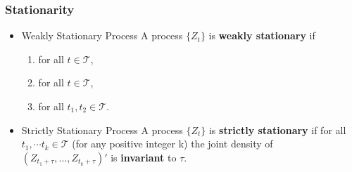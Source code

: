 \documentclass{beamer}
\begin{document}
		
		\begin{frame}
			
			\frametitle{Stationarity}
			\large
			\begin{itemize}
				\item[]\begin{mydef*}[width=5.5in]{Weakly Stationary Process}  A process $\{Z_t\}$   is \textbf{weakly stationary} if
					\vspace{4pt}
					\begin{enumerate}\large
							
						\item[]  for all $t\in\mathcal{T}$,\medskip
						
						\item[]   for all $t\in\mathcal{T}$,
						\medskip
						
						\item[]  for all  $t_1,t_2\in\mathcal{T}$.
					\end{enumerate}
				\end{mydef*}
				
				\pause
				\vspace{25pt}
				
					\item[]\begin{mydef*}[width=5.5in]{Strictly Stationary Process}  A process $\{Z_t\}$   is \textbf{strictly stationary} if for all $t_1,\cdots t_k \in \mathcal{T}$ (for any positive integer k) the joint density of $(Z_{t_1+\tau},...,Z_{t_k+\tau})'$ is \textbf{invariant} to $\tau$.
						
			
					\end{mydef*}	
				
				
				\end{itemize}
			\end{frame}
		
\end{document}
